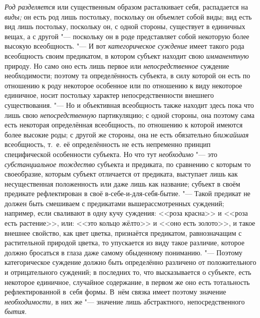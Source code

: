 {\em Род разделяется} или существенным образом расталкивает себя,
распадается на {\em виды;} он есть род
лишь постольку, поскольку он объемлет собой виды; вид есть вид лишь
постольку, поскольку он, с одной стороны, существует в единичных вещах, а с
другой "--- поскольку он в роде представляет собой некоторую
более высокую всеобщность. "--- И вот {\em категорическое суждение}
имеет такого рода всеобщность своим предикатом, в котором
субъект находит свою {\em имманентную}
природу. Но само оно есть лишь первое или {\em непосредственное}
суждение необходимости; поэтому та определённость субъекта, в
силу которой он есть по отношению к роду некоторое особенное или по
отношению к виду некоторое единичное, носит постольку характер
непосредственности внешнего существования. "--- Но и
объективная всеобщность также находит здесь пока что лишь
свою {\em непосредственную}
партикуляцию; с одной стороны, она поэтому сама есть
некоторая определённая всеобщность, по отношению к которой имеются более
высокие роды; с другой же стороны, она не есть обязательно {\em ближайшая}
всеобщность, т.~е. её определённость не есть непременно
принцип специфической особенности субъекта. Но что тут
{\em необходимо} "--- это {\em субстанциальное тождество}
субъекта и предиката, по сравнению с которым то своеобразие,
которым субъект отличается от предиката, выступает лишь как несущественная
положенность или даже лишь как название; субъект в своём предикате
рефлектирован в своё в-себе-и-для-себя-бытие. "--- Такой
предикат не должен быть смешиваем с предикатами вышерассмотренных суждений;
например, если сваливают в одну кучу суждения: <<роза красна>> и
<<роза есть растение>>, или: <<это кольцо жёлто>> и <<оно есть золото>>,
и такое внешнее свойство, как цвет цветка, признаётся
предикатом, равнозначащим с растительной природой цветка, то упускается из
виду такое различие, которое должно бросаться в глаза даже самому
обыденному пониманию. "--- Поэтому категорическое суждение
должно быть определённо различено от положительного и отрицательного
суждений; в последних то, что высказывается о субъекте, есть некоторое
единичное, случайное содержание, в первом же оно есть тотальность
рефлектированной в~себя формы. В~нём связка имеет поэтому значение
{\em необходимости,} в них же "--- значение лишь абстрактного,
непосредственного {\em бытия}.

